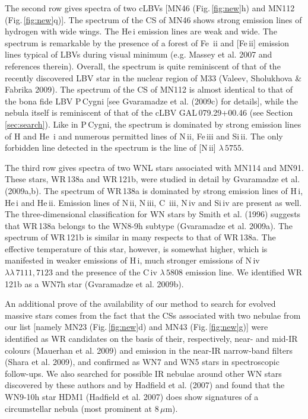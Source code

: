 \documentclass[useAMS]{mn2e}
\begin{document}
The second row gives spectra of two cLBVs [MN46
(Fig.\,\ref{fig:new}h) and MN112 (Fig.\,\ref{fig:new}q)]. The
spectrum of the CS of MN46 shows strong emission lines of hydrogen
with wide wings. The He\,{\sc i} emission lines are weak and wide.
The spectrum is remarkable by the presence of a forest of Fe\,{\sc
ii} and [Fe\,{\sc ii}] emission lines typical of LBVs during visual
minimum (e.g. Massey et al. 2007 and references therein). Overall,
the spectrum is quite reminiscent of that of the recently discovered
LBV star in the nuclear region of M33 (Valeev, Sholukhova \& Fabrika
2009). The spectrum of the CS of MN112 is almost identical to that
of the bona fide LBV P\,Cygni [see Gvaramadze et al. (2009c) for
details], while the nebula itself is reminiscent of that of the cLBV
GAL\,079.29+00.46 (see Section\,\ref{sec:search}). Like in P\,Cygni,
the spectrum is dominated by strong emission lines of H and He\,{\sc
i} and numerous permitted lines of N\,{\sc ii}, Fe\,{\sc iii} and
Si\,{\sc ii}. The only forbidden line detected in the spectrum is
the line of [N\,{\sc ii}] $\lambda \,5755$.

The third row gives spectra of two WNL stars associated with MN114
and MN91. These stars, WR\,138a and WR\,121b, were studied in detail
by Gvaramadze et al. (2009a,b). The spectrum of WR\,138a is
dominated by strong emission lines of H\,{\sc i}, He\,{\sc i} and
He\,{\sc ii}. Emission lines of N\,{\sc ii}, N\,{\sc iii}, C\,{\sc
iii}, N\,{\sc iv} and Si\,{\sc iv} are present as well. The
three-dimensional classification for WN stars by Smith et al. (1996)
suggests that WR\,138a belongs to the WN8-9h subtype (Gvaramadze et
al. 2009a). The spectrum of WR\,121b is similar in many respects to
that of WR\,138a. The effective temperature of this star, however,
is somewhat higher, which is manifested in weaker emissions of
H\,{\sc i}, much stronger emissions of N\,{\sc iv} $\lambda\lambda
\, 7111, 7123$ and the presence of the C\,{\sc iv} $\lambda \, 5808$
emission line. We identified WR\,121b as a WN7h star (Gvaramadze et
al. 2009b).

An additional prove of the availability of our method to search for
evolved massive stars comes from the fact that the CSs associated
with two nebulae from our list [namely MN23 (Fig.\,\ref{fig:new}d)
and MN43 (Fig.\,\ref{fig:new}g)] were identified as WR candidates on
the basis of their, respectively, near- and mid-IR colours (Mauerhan
et al. 2009) and emission in the near-IR narrow-band filters (Shara
et al. 2009), and confirmed as WN7 and WN5 stars in spectroscopic
follow-ups. We also searched for possible IR nebulae around other WN
stars discovered by these authors and by Hadfield et al. (2007) and
found that the WN9-10h star HDM1 (Hadfield et al. 2007) does show
signatures of a circumstellar nebula (most prominent at $8\, \mu$m).
\end{document}
